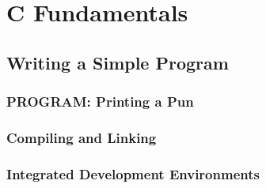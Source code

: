 


\chapter[C Fundamentals]{C Fundamentals}


\section[simple program]{Writing a Simple Program}


\subsection*{PROGRAM: Printing a Pun}




\subsection*{Compiling and Linking}
\subsection*{Integrated Development Environments}

